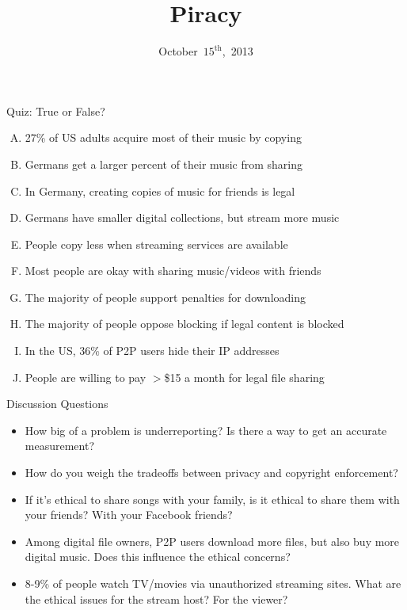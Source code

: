 \documentclass{beamer}
\title{Piracy}
\date{October~$15^{\text{th}}$,~2013}
\begin{document}
\begin{frame}
\titlepage
\end{frame}

\begin{frame}{Quiz: True or False?}

\begin{enumerate}[(A)]
\item<1> 27\% of US adults acquire most of their music by copying %
\item<1> Germans get a larger percent of their music from sharing %
\item<1-2> In Germany, creating copies of music for friends is legal
\item<1> Germans have smaller digital collections, but stream more music %
\item<1-2> People copy less when streaming services are available
\item<1> Most people are okay with sharing music/videos with friends %
\item<1-2> The majority of people support penalties for downloading
\item<1> The majority of people oppose blocking if legal content is blocked %
\item<1> In the US, 36\% of P2P users hide their IP addresses %
\item<1-2> People are willing to pay $>$\$15 a month for legal file sharing
\end{enumerate}
\end{frame}

\begin{frame}{Discussion Questions}
\begin{itemize}
\item How big of a problem is underreporting? Is there a way to get an accurate measurement?
\pause
\bigskip
\item How do you weigh the tradeoffs between privacy and copyright enforcement?
\pause
\bigskip
\item If it's ethical to share songs with your family, is it ethical to share them with your friends? With your Facebook friends?
\pause
\bigskip
\item Among digital file owners, P2P users download more files, but also buy more digital music. Does this influence the ethical concerns?
\pause
\bigskip
\item 8-9\% of people watch TV/movies via unauthorized streaming sites. What are the ethical issues for the stream host? For the viewer?
\end{itemize}
\end{frame}
\end{document}
